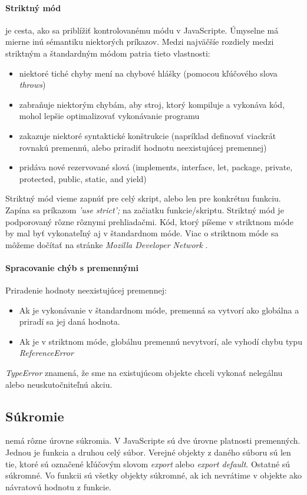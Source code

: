 \paragraph{Striktný mód} je cesta, ako sa priblížiť kontrolovanému módu v JavaScripte. Úmyselne má mierne inú sémantiku niektorých príkazov. Medzi najväčšíe rozdiely medzi striktným a štandardným módom patria tieto vlastnosti:
\begin{itemize}
  \item niektoré tiché chyby mení na chybové hlášky (pomocou kľúčového slova \emph{throws})
  \item zabraňuje niektorým chybám, aby stroj, ktorý kompiluje a vykonáva kód, mohol lepšie optimalizovať vykonávanie programu
  \item zakazuje niektoré syntaktické konštrukcie (napríklad definovať viackrát rovnakú premennú, alebo priradiť hodnotu neexistujúcej premennej)
  \item pridáva nové rezervované slová (implements, interface, let, package, private, protected, public, static, and yield)
\end{itemize}

Striktný mód vieme zapnúť pre celý skript, alebo len pre konkrétnu funkciu. Zapína sa príkazom \emph{'use strict';} na začiatku funkcie/skriptu.
Striktný mód je podporovaný rôzne rôznymi prehliadačmi. Kód, ktorý píšeme v striktnom móde by mal byť vykonateľný aj v štandardnom móde. Viac o striktnom móde sa môžeme dočítať na stránke \emph{Mozilla Developer Network} \cite{strict}.

\paragraph{Spracovanie chýb s premennými\\}
Priradenie hodnoty neexistujúcej premennej:
\begin{itemize}
\item Ak je vykonávanie v štandardnom móde, premenná sa vytvorí ako globálna a priradí sa jej daná hodnota.
\item Ak je v striktnom móde, globálnu premennú nevytvorí, ale vyhodí chybu typu \emph{ReferenceError}
\end{itemize}

\emph{TypeError} znamená, že sme na existujúcom objekte chceli vykonať nelegálnu alebo neuskutočniteľnú akciu.

\subsection{Súkromie}
\JS{} nemá rôzne úrovne súkromia. V JavaScripte sú dve úrovne platnosti premenných. Jednou je funkcia a druhou celý súbor. Verejné objekty z daného súboru sú len tie, ktoré sú označené kľúčovým slovom \emph{export} alebo \emph{export default}. Ostatné sú súkromné. Vo funkcii sú všetky objekty súkromné, ak ich nevrátime v objekte ako návratovú hodnotu z funkcie.

